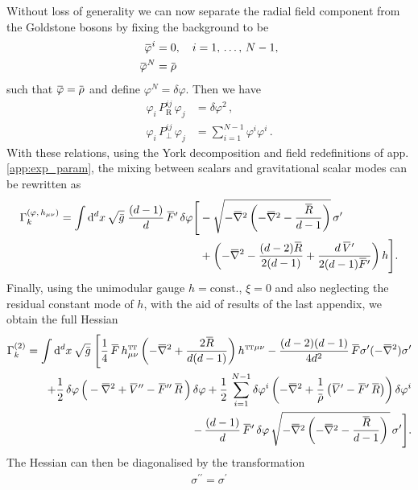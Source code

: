 \documentclass[11pt]{book}
\newcommand{\overbar}[1]{\mkern 1.5mu\overline{\mkern-1.5mu#1\mkern-1.5mu}\mkern 1.5mu}
\newcommand\TTspace{ -1pt }
\newcommand\TT{ \scriptscriptstyle{\mathrm{T\hspace{\TTspace}T}} }
\newcommand\hTTmunu{ h^{\scriptscriptstyle{\mathrm{T\hspace{\TTspace}T}}}_{\mu\nu} }
\newcommand{\bnabla}{\overbar \nabla}
\newcommand{\bR}{\overbar R}
\newcommand{\bV}{\overbar V}
\newcommand{\bF}{\overbar F}
\newcommand{\bp}{\overbar \varphi}
\newcommand{\deltap}{\delta \varphi}
\newcommand{\projR}{ P_{\scriptscriptstyle\mathrm R}^{ij} }
\newcommand{\projperp}{ P_{\scriptscriptstyle \perp}^{ij} }
\numberwithin{equation}{chapter}
\begin{document}
\begin{appendices}
Without loss of generality we can now separate the radial field component from the
Goldstone bosons by fixing the background to be
\begin{align}
  \bp^i &= 0, \quad i = 1,\, \dots,\, N-1, \\
  \bp^N &= \overbar \rho
\end{align}
such that $\bp = \overbar \rho$ and define $\varphi^N = \deltap$. Then we have
\begin{align}
  \varphi_i \, \projR    \, \varphi_j &= \deltap^2 \,, \\
  \varphi_i \, \projperp \, \varphi_j &= \sum_{i=1}^{N-1} \varphi^i \varphi^i \,.
\end{align}
With these relations, using the York decomposition and field redefinitions
of app. \ref{app:exp_param}, the mixing between scalars and gravitational scalar
modes can be rewritten as
\begin{align}
  \Gamma_k^{(\varphi,\, h_{\mu\nu})} =
  \int \mathrm{d}^d x \, \sqrt{\bar{g}} \;
  \frac{(d-1)}{d} \, \bF' \, \deltap
  \Bigg[
    &- \sqrt{-\bnabla^2 \left(-\bnabla^2-\frac{\bR}{d-1} \right)} \, \sigma' \nonumber \\
    &+
    \left(
      -\bnabla^2
      -\frac{(d-2) \bR}{2(d-1)}
      +\frac{d\,\bV'}{2(d-1) \bF'}
    \right)
    h
  \Bigg] .
\end{align}
Finally, using the unimodular gauge $h = \text{const.}$,
$\xi=0$ and also neglecting the residual constant mode of $h$,
with the aid of results of the last appendix,
we obtain the full Hessian
\begin{align}
  \Gamma_k^{(2)} = \int \mathrm d^d x \, \sqrt{\bar{g}} \;
  \Bigg[
    \frac{1}{4} \, \bF \, \hTTmunu \left( -\bnabla^2 + \frac{2 \bR}{d(d-1)} \right) h^{{\TT}\mu\nu}
    - \frac{(d-2)(d-1)}{4d^2} \, \bF \sigma^{\prime} (-\bnabla^2) \sigma^{\prime}
    \nonumber\\
    +\frac{1}{2} \, \deltap \, \Big( -\bnabla^2 + \bV'' - \bF'' \, \bR \, \Big) \, \deltap
    +\frac{1}{2} \, \sum_{i=1}^{N-1} \deltap^i
    \left(
      -\bnabla^2 +\frac{1}{\overbar \rho} \, \big( \bV' - \bF' \, \bR \big) \right) \deltap^i \nonumber \\
    - \, \frac{(d-1)}{d} \, \bF' \, \deltap \,
    \sqrt{ - \bnabla^2 \left( -\bnabla^2 - \frac{\bR}{d-1} \right) \, } \, \sigma^{\prime}
  \Bigg] .
  \label{oldHessian}
\end{align}
The Hessian can then be diagonalised by the transformation
\begin{align}
  \sigma^{\prime\prime} = \sigma^{\prime}

\end{align}
\end{appendices}
\end{document}
